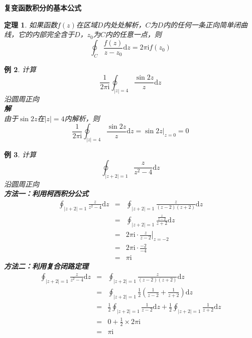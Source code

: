 \documentclass[12pt, a4paper, twoside]{ctexbook}
\newtheorem{theorem}{定理}[section]
\newtheorem{example}[theorem]{例}
\begin{document}
\textbf{复变函数积分的基本公式}
\begin{theorem}
	如果函数$f\left(z\right)$在区域$D$内处处解析，$C$为$D$内的任何一条正向简单闭曲线，它的内部完全含于$D$，$z_0$为$C$内的任意一点，则
	$$
	\oint_C{\frac{f\left( z \right)}{z-z_0}\mathrm{d}z=}2\pi \mathrm{i}f\left( z_0 \right) 
	$$
\end{theorem}
\newpage
\begin{example}
	计算
	$$
	\frac{1}{2\pi\mathrm{i}}\oint_{\left|z\right|=4}{\frac{\sin 2z}{z}\mathrm{d}z}
	$$
	\hspace*{2em}沿圆周正向\\
	\hspace*{1em}\textbf{解}\\
	\hspace*{2em}由于$\sin 2z$在$\left|z\right|=4$内解析，则
	$$
	\frac{1}{2\pi\mathrm{i}}\oint_{\left|z\right|=4}{\frac{\sin 2z}{z}\mathrm{d}z}=\left.\sin 2z \right|_{z=0}=0
	$$
\end{example}
\begin{example}
	计算
	$$
	\oint_{\left|z+2\right|=1}{\frac{z}{z^2-4}}\mathrm{d}z
	$$
	\hspace*{2em}沿圆周正向\\
	\hspace*{1em}\textbf{方法一：利用柯西积分公式}\\
	\begin{eqnarray}
        \oint_{\left|z+2\right|=1}{\frac{z}{z^2-4}}\mathrm{d}z&=&\oint_{\left| z+2 \right|=1}{\frac{z}{\left( z-2 \right) \left( z+2 \right)}\mathrm{d}z} \nonumber      \\
        ~&=&\oint_{\left| z+2 \right|=1}{\frac{\frac{z}{z-2}}{z+2}\mathrm{d}z} \nonumber    \\
        ~&=&2\pi\mathrm{i}\cdot\left.\frac{z}{z-2}\right|_{z=-2} \nonumber	  \\
		~&=&2\pi\mathrm{i}\cdot \frac{-2}{-4} \nonumber  \\
		~&=&\pi\mathrm{i} \nonumber
	\end{eqnarray}
	\hspace*{1em}\textbf{方法二：利用复合闭路定理}\\
	\begin{eqnarray}
        \oint_{\left|z+2\right|=1}{\frac{z}{z^2-4}}\mathrm{d}z&=&\oint_{\left| z+2 \right|=1}{\frac{z}{\left( z-2 \right) \left( z+2 \right)}\mathrm{d}z} \nonumber      \\
        ~&=&\oint_{\left| z+2 \right|=1}{\frac{1}{2}\left( \frac{1}{z-2}+\frac{1}{z+2} \right) \mathrm{d}z} \nonumber    \\
        ~&=&\frac{1}{2}\oint_{\left| z+2 \right|=1}{\frac{1}{z-2}\mathrm{d}z}+\frac{1}{2}\oint_{\left| z+2 \right|=1}{\frac{1}{z+2}\mathrm{d}z} \nonumber	  \\
		~&=&0+\frac{1}{2}\times2\pi\mathrm{i} \nonumber  \\
		~&=&\pi\mathrm{i} \nonumber
	\end{eqnarray}
\end{example}
\end{document}
